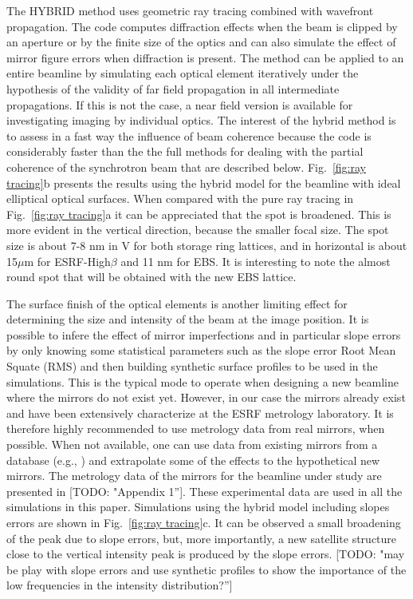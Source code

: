 \documentclass{iucr}              %
\newcommand{\todo}[1]{{\color{red}[TODO: "#1'']}}
\begin{document}
The HYBRID method \cite{hybrid} uses geometric ray tracing combined with wavefront propagation. The code computes diffraction effects when the beam is clipped by an aperture or by the finite size of the optics and can also simulate the effect of mirror figure errors when diffraction is present. The method can be applied to an entire beamline by simulating each optical element iteratively under the hypothesis of the validity of far field propagation in all intermediate propagations. If this is not the case, a near field version is available for investigating imaging by individual optics. The interest of the hybrid method is to assess in a fast way the influence of beam coherence because the code is considerably faster than the the full methods for dealing with the partial coherence of the synchrotron beam that are described below. Fig.~\ref{fig:ray tracing}b presents the results using the hybrid model for the beamline with ideal elliptical optical surfaces. When compared with the pure ray tracing in Fig.~\ref{fig:ray tracing}a it can be appreciated that the spot is broadened. This is more evident in the vertical direction, because the smaller focal size. The spot size is about 7-8 nm in V for both storage ring lattices, and in horizontal is about 15$\mu$m for ESRF-High$\beta$ and 11 nm for EBS. It is interesting to note the almost round spot that will be obtained with the new EBS lattice. 

The surface finish of the optical elements is another limiting effect for determining the size and intensity of the beam at the image position. It is possible to infere the effect of mirror imperfections and in particular slope errors by only knowing some statistical parameters such as the slope error Root Mean Squate (RMS) and then building synthetic surface profiles to be used in the simulations. This is the typical mode to operate when designing a new beamline where the mirrors do not exist yet. However, in our case the mirrors already exist and have been extensively characterize at the ESRF metrology laboratory. It is therefore highly recommended to use metrology data from real mirrors, when possible. When not available, one can use data from existing mirrors from a database (e.g., \cite{dabam}) and extrapolate some of the effects to the hypothetical new mirrors. The metrology data of the mirrors for the beamline under study are presented in \todo{Appendix 1}. These experimental data are used in all the simulations in this paper. Simulations using the hybrid model including slopes errors are shown in Fig.~\ref{fig:ray tracing}c. It can be observed a small broadening of the peak due to slope errors, but, more importantly, a new satellite structure close to the vertical intensity peak is produced by the slope errors. \todo{may be play with slope errors and use synthetic profiles to show the importance of the low frequencies in the intensity distribution?}
\end{document}
